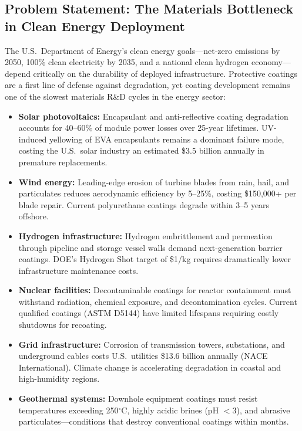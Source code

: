 \documentclass[11pt,letterpaper]{article}
\begin{document}
\subsection{Problem Statement: The Materials Bottleneck in Clean Energy Deployment}

The U.S.\ Department of Energy's clean energy goals---net-zero emissions by 2050, 100\% clean electricity by 2035, and a national clean hydrogen economy---depend critically on the durability of deployed infrastructure. Protective coatings are a first line of defense against degradation, yet coating development remains one of the slowest materials R\&D cycles in the energy sector:

\begin{itemize}[noitemsep]
  \item \textbf{Solar photovoltaics:} Encapsulant and anti-reflective coating degradation accounts for 40--60\% of module power losses over 25-year lifetimes. UV-induced yellowing of EVA encapsulants remains a dominant failure mode, costing the U.S.\ solar industry an estimated \$3.5 billion annually in premature replacements.
  \item \textbf{Wind energy:} Leading-edge erosion of turbine blades from rain, hail, and particulates reduces aerodynamic efficiency by 5--25\%, costing \$150,000+ per blade repair. Current polyurethane coatings degrade within 3--5 years offshore.
  \item \textbf{Hydrogen infrastructure:} Hydrogen embrittlement and permeation through pipeline and storage vessel walls demand next-generation barrier coatings. DOE's Hydrogen Shot target of \$1/kg requires dramatically lower infrastructure maintenance costs.
  \item \textbf{Nuclear facilities:} Decontaminable coatings for reactor containment must withstand radiation, chemical exposure, and decontamination cycles. Current qualified coatings (ASTM D5144) have limited lifespans requiring costly shutdowns for recoating.
  \item \textbf{Grid infrastructure:} Corrosion of transmission towers, substations, and underground cables costs U.S.\ utilities \$13.6 billion annually (NACE International). Climate change is accelerating degradation in coastal and high-humidity regions.
  \item \textbf{Geothermal systems:} Downhole equipment coatings must resist temperatures exceeding 250$^\circ$C, highly acidic brines (pH $< 3$), and abrasive particulates---conditions that destroy conventional coatings within months.
\end{itemize}
\end{document}

